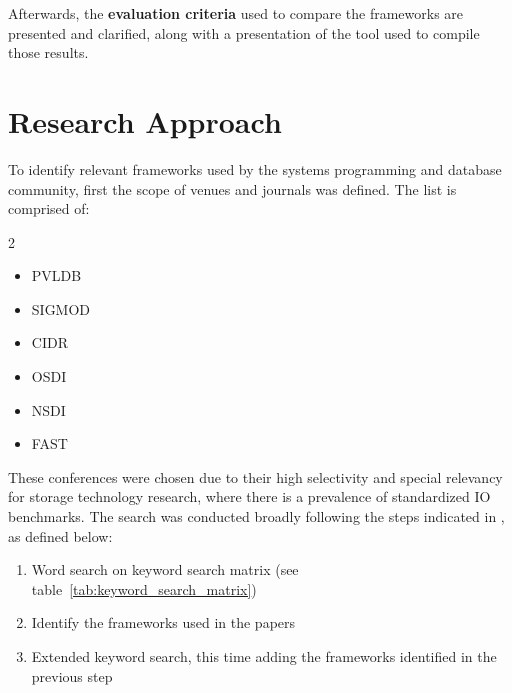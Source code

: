 Afterwards, the \textbf{evaluation criteria} used to compare the frameworks are presented and clarified, along with a presentation of 
the tool used to compile those results.


\section{Research Approach}
To identify relevant frameworks used by the systems programming and database community, first the scope of 
venues and journals was defined. The list is comprised of:
\begin{center} %
    \begin{minipage}{0.8\linewidth} %
      \begin{multicols}{2} %
        \begin{itemize}
          \item \ac{PVLDB}
          \item \ac{SIGMOD}
          \item \ac{CIDR}
          \item \ac{OSDI}
          \item \ac{NSDI}
          \item \ac{FAST}
        \end{itemize}
      \end{multicols}
      \label{list:conferences}
    \end{minipage}
\end{center}

These conferences were chosen due to their high selectivity and special relevancy for storage technology research, where there is a prevalence of 
standardized IO benchmarks. The search was conducted broadly following the steps indicated in \parencite{bramerSystematicApproachSearching2018}, as defined below: 
\begin{enumerate}
    \item Word search on keyword search matrix (see table~\ref{tab:keyword_search_matrix})
    \item Identify the frameworks used in the papers
    \item Extended keyword search, this time adding the frameworks identified in the previous step
\end{enumerate} 

